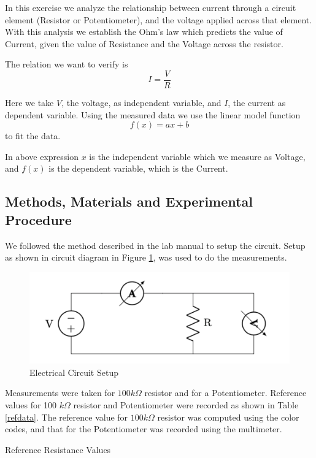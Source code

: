 \documentclass[letterpaper,12pt]{article}
\begin{document}
In this exercise we analyze the relationship between current through a circuit element (Resistor or Potentiometer), and the voltage applied across that element. 
With this analysis we establish the Ohm's law which predicts the value of Current, given the value of Resistance and the 
Voltage across the resistor.

The relation we want to verify is $$I = \frac{V}{R}$$

Here we take $V$, the voltage, as independent variable, and $I$, the current as dependent variable. Using the measured data
we use the linear model function $$f(x) = ax + b$$ to fit the data. 

In above expression $x$ is the independent variable which we measure as Voltage, and $f(x)$ is the dependent variable, which is 
the Current.

\subsection{Methods, Materials and Experimental Procedure}

We followed the method described in the lab manual\cite{lab-manual-ex1} to setup the circuit. Setup as shown in circuit
diagram in Figure \ref{setup}, was used to do the measurements.

\begin{figure}[H]
  \centering
  \includegraphics[width=0.9\linewidth]{../Exercise1/lab_1_ex_1_setup.png}    
  \caption{Electrical Circuit Setup}
  \label{setup}
\end{figure}

Measurements were taken for $100 k\Omega$ resistor and for a Potentiometer. Reference values
for 100 $k\Omega$ resistor and Potentiometer were recorded as shown in Table \ref{refdata}. The reference value
for $100 k\Omega$ resistor was computed using the color codes, and that for the Potentiometer 
was recorded using the multimeter.

\begin{table}[H]
  \centering
  \caption{Reference Resistance Values}
  \label{refdata}
\end{table}
\end{document}
